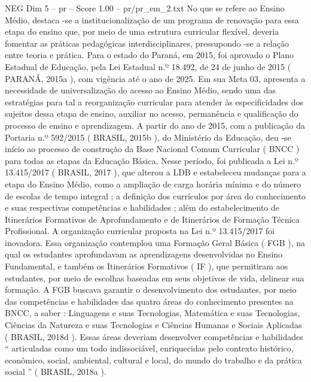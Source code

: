 \begin{textsample}{NEG Dim 5 – pr – Score 1.00 – pr/pr\_em\_2.txt}
No que se refere ao Ensino Médio, destaca -se a institucionalização de um programa de renovação para essa etapa do ensino que, por meio de uma estrutura curricular flexível, deveria fomentar as práticas pedagógicas interdisciplinares, pressupondo -se a relação entre teoria e prática.
Para o estado do Paraná, em 2015, foi aprovado o Plano Estadual de Educação, pela Lei Estadual n.º 18.492, de 24 de junho de 2015 ( PARANÁ, 2015a ), com vigência até o ano de 2025.
Em sua Meta 03, apresenta a necessidade de universalização do acesso ao Ensino Médio, sendo uma das estratégias para tal a reorganização curricular para atender às especificidades dos sujeitos dessa etapa de ensino, auxiliar no acesso, permanência e qualificação do processo de ensino e aprendizagem.
A partir do ano de 2015, com a publicação da Portaria n.º 592/2015 ( BRASIL, 2015b ), do Ministério da Educação, deu -se início ao processo de construção da Base Nacional Comum Curricular ( BNCC ) para todas as etapas da Educação Básica.
Nesse período, foi publicada a Lei n.º 13.415/2017 ( BRASIL, 2017 ), que alterou a LDB e estabeleceu mudanças para a etapa do Ensino Médio, como a ampliação de carga horária mínima e do número de escolas de tempo integral ; a definição dos currículos por área do conhecimento e suas respectivas competências e habilidades ; além do estabelecimento de Itinerários Formativos de Aprofundamento e de Itinerários de Formação Técnica Profissional.
A organização curricular proposta na Lei n.º 13.415/2017 foi inovadora.
Essa organização contemplou uma Formação Geral Básica ( FGB ), na qual os estudantes aprofundavam as aprendizagens desenvolvidas no Ensino Fundamental, e também os Itinerários Formativos ( IF ), que permitiram aos estudantes, por meio de escolhas baseadas em seus objetivos de vida, delinear sua formação.
A FGB buscava garantir o desenvolvimento dos estudantes, por meio das competências e habilidades das quatro áreas do conhecimento presentes na BNCC, a saber : Linguagens e suas Tecnologias, Matemática e suas Tecnologias, Ciências da Natureza e suas Tecnologias e Ciências Humanas e Sociais Aplicadas ( BRASIL, 2018d ).
Essas áreas deveriam desenvolver competências e habilidades “ articuladas como um todo indissociável, enriquecidas pelo contexto histórico, econômico, social, ambiental, cultural e local, do mundo do trabalho e da prática social ” ( BRASIL, 2018a ).

\end{textsample}
